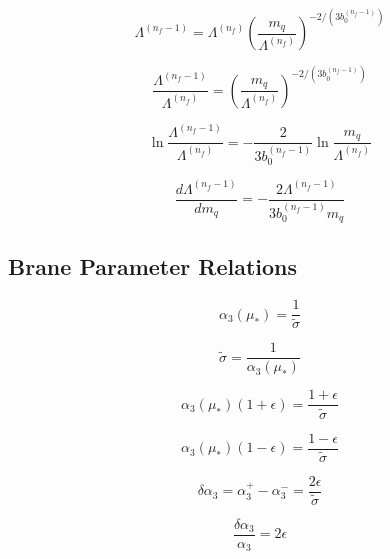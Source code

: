 \documentclass[11pt,a4paper]{article}
\theoremstyle{definition}
\begin{document}
\begin{equation}
\label{eq:add-29}
\Lambda^{(n_f-1)} = \Lambda^{(n_f)}\left(\frac{m_q}{\Lambda^{(n_f)}}\right)^{-2/(3b_0^{(n_f-1)})}
\end{equation}

\begin{equation}
\label{eq:add-30}
\frac{\Lambda^{(n_f-1)}}{\Lambda^{(n_f)}} = \left(\frac{m_q}{\Lambda^{(n_f)}}\right)^{-2/(3b_0^{(n_f-1)})}
\end{equation}

\begin{equation}
\label{eq:add-31}
\ln\frac{\Lambda^{(n_f-1)}}{\Lambda^{(n_f)}} = -\frac{2}{3b_0^{(n_f-1)}}\ln\frac{m_q}{\Lambda^{(n_f)}}
\end{equation}

\begin{equation}
\label{eq:add-32}
\frac{d\Lambda^{(n_f-1)}}{d m_q} = -\frac{2\Lambda^{(n_f-1)}}{3b_0^{(n_f-1)} m_q}
\end{equation}

\subsection{Brane Parameter Relations}
\label{subsec:add-brane}

\begin{equation}
\label{eq:add-33}
\alpha_3(\mu_*) = \frac{1}{\tilde{\sigma}}
\end{equation}

\begin{equation}
\label{eq:add-34}
\tilde{\sigma} = \frac{1}{\alpha_3(\mu_*)}
\end{equation}

\begin{equation}
\label{eq:add-35}
\alpha_3(\mu_*)(1+\epsilon) = \frac{1+\epsilon}{\tilde{\sigma}}
\end{equation}

\begin{equation}
\label{eq:add-36}
\alpha_3(\mu_*)(1-\epsilon) = \frac{1-\epsilon}{\tilde{\sigma}}
\end{equation}

\begin{equation}
\label{eq:add-37}
\delta\alpha_3 = \alpha_3^+ - \alpha_3^- = \frac{2\epsilon}{\tilde{\sigma}}
\end{equation}

\begin{equation}
\label{eq:add-38}
\frac{\delta\alpha_3}{\alpha_3} = 2\epsilon
\end{equation}
\end{document}
